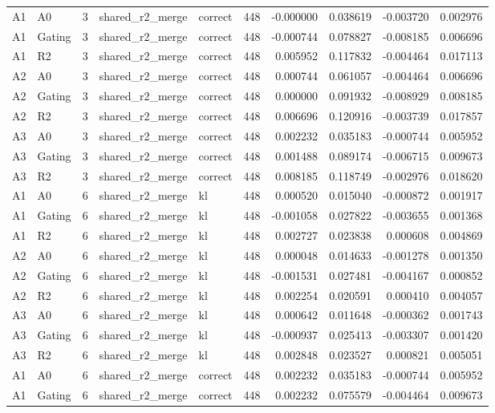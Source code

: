 \begin{tabular}{llrllrrrrr}
A1 & A0 & 3 & shared_r2_merge & correct & 448 & -0.000000 & 0.038619 & -0.003720 & 0.002976 \\
A1 & Gating & 3 & shared_r2_merge & correct & 448 & -0.000744 & 0.078827 & -0.008185 & 0.006696 \\
A1 & R2 & 3 & shared_r2_merge & correct & 448 & 0.005952 & 0.117832 & -0.004464 & 0.017113 \\
A2 & A0 & 3 & shared_r2_merge & correct & 448 & 0.000744 & 0.061057 & -0.004464 & 0.006696 \\
A2 & Gating & 3 & shared_r2_merge & correct & 448 & 0.000000 & 0.091932 & -0.008929 & 0.008185 \\
A2 & R2 & 3 & shared_r2_merge & correct & 448 & 0.006696 & 0.120916 & -0.003739 & 0.017857 \\
A3 & A0 & 3 & shared_r2_merge & correct & 448 & 0.002232 & 0.035183 & -0.000744 & 0.005952 \\
A3 & Gating & 3 & shared_r2_merge & correct & 448 & 0.001488 & 0.089174 & -0.006715 & 0.009673 \\
A3 & R2 & 3 & shared_r2_merge & correct & 448 & 0.008185 & 0.118749 & -0.002976 & 0.018620 \\
A1 & A0 & 6 & shared_r2_merge & kl & 448 & 0.000520 & 0.015040 & -0.000872 & 0.001917 \\
A1 & Gating & 6 & shared_r2_merge & kl & 448 & -0.001058 & 0.027822 & -0.003655 & 0.001368 \\
A1 & R2 & 6 & shared_r2_merge & kl & 448 & 0.002727 & 0.023838 & 0.000608 & 0.004869 \\
A2 & A0 & 6 & shared_r2_merge & kl & 448 & 0.000048 & 0.014633 & -0.001278 & 0.001350 \\
A2 & Gating & 6 & shared_r2_merge & kl & 448 & -0.001531 & 0.027481 & -0.004167 & 0.000852 \\
A2 & R2 & 6 & shared_r2_merge & kl & 448 & 0.002254 & 0.020591 & 0.000410 & 0.004057 \\
A3 & A0 & 6 & shared_r2_merge & kl & 448 & 0.000642 & 0.011648 & -0.000362 & 0.001743 \\
A3 & Gating & 6 & shared_r2_merge & kl & 448 & -0.000937 & 0.025413 & -0.003307 & 0.001420 \\
A3 & R2 & 6 & shared_r2_merge & kl & 448 & 0.002848 & 0.023527 & 0.000821 & 0.005051 \\
A1 & A0 & 6 & shared_r2_merge & correct & 448 & 0.002232 & 0.035183 & -0.000744 & 0.005952 \\
A1 & Gating & 6 & shared_r2_merge & correct & 448 & 0.002232 & 0.075579 & -0.004464 & 0.009673 \\

\end{tabular}
